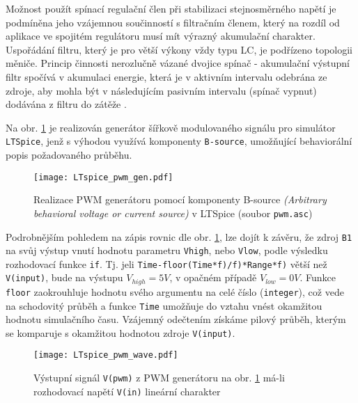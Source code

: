     Možnost použít spínací regulační člen při stabilizaci stejnosměrného napětí je podmíněna jeho 
    vzájemnou součinností s filtračním členem, který na rozdíl od aplikace ve spojitém regulátoru 
    musí mít výrazný akumulační charakter. Uspořádání filtru, který je pro větší výkony vždy typu 
    LC, je podřízeno topologii měniče. Princip činnosti nerozlučně vázané dvojice spínač - 
    akumulační výstupní filtr spočívá v akumulaci energie, která je v aktivním intervalu odebrána ze 
    zdroje, aby mohla být v následujícím pasivním intervalu (spínač vypnut) dodávána z filtru do 
    zátěže \cite[s.~121]{Hammembauer}.
           
    \begin{example} 
      Na obr. \ref{enz:fig_pwm_gen} je realizován generátor šířkově modulovaného signálu pro
      simulátor \texttt{LTSpice}, jenž s výhodou využívá komponenty \texttt{B-source}, umožňující
      behaviorální popis požadovaného průběhu.
      \begin{figure}[ht!]
        \centering
        \texttt{[image: LTspice\_pwm\_gen.pdf]}
        \caption[LTSpice - PWM generátor]{Realizace PWM generátoru pomocí komponenty B-source
                \emph{(Arbitrary behavioral voltage or current source)} v LTSpice (soubor
                \texttt{pwm.asc})}
        \label{enz:fig_pwm_gen}
      \end{figure}
      Podrobnějším pohledem na zápis rovnic dle obr. \ref{enz:fig_pwm_gen}, lze dojít k závěru, že
      zdroj \texttt{B1} na svůj výstup vnutí hodnotu parametru \texttt{Vhigh}, nebo \texttt{Vlow},
      podle výsledku rozhodovací funkce \texttt{if}. Tj. jeli
      \texttt{Time-floor(Time*f)/f)*Range*f)} větší než \texttt{V(input)}, bude na výstupu $V_{high}
      = 5V$, v opačném případě $V_{low} = 0V$. Funkce \texttt{floor} zaokrouhluje hodnotu svého
      argumentu na celé číslo (\texttt{integer}), což vede na schodovitý průběh a funkce
      \texttt{Time} umožňuje do vztahu vnést okamžitou hodnotu simulačního času. Vzájemný odečtením
      získáme pilový průběh, kterým se komparuje s okamžitou hodnotou zdroje \texttt{V(input)}.
       
       \begin{figure}[ht!]
         \centering
         \texttt{[image: LTspice\_pwm\_wave.pdf]}
         \caption[LTSpice - PWM generátor: průběhy]{Výstupní signál \texttt{V(pwm)} z PWM
                  generátoru na obr. \ref{enz:fig_pwm_gen}  má-li rozhodovací napětí \texttt{V(in)}
                  lineární charakter}
         \label{enz:fig_pwm_wave}
       \end{figure}       
    \end{example} 
   
